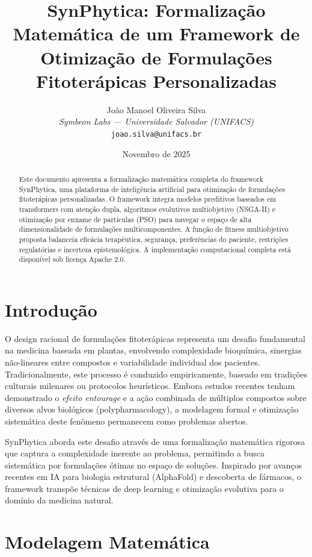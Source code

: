 \documentclass[12pt, a4paper]{article}
\title{\textbf{SynPhytica: Formalização Matemática de um Framework de Otimização de Formulações Fitoterápicas Personalizadas}}
\author{
    João Manoel Oliveira Silva \\
    \textit{Symbeon Labs — Universidade Salvador (UNIFACS)} \\
    \texttt{joao.silva@unifacs.br}
}
\date{Novembro de 2025}
\begin{document}
\maketitle

\begin{abstract}
Este documento apresenta a formalização matemática completa do framework SynPhytica, uma plataforma de inteligência artificial para otimização de formulações fitoterápicas personalizadas. O framework integra modelos preditivos baseados em transformers com atenção dupla, algoritmos evolutivos multiobjetivo (NSGA-II) e otimização por enxame de partículas (PSO) para navegar o espaço de alta dimensionalidade de formulações multicomponentes. A função de fitness multiobjetivo proposta balanceia eficácia terapêutica, segurança, preferências do paciente, restrições regulatórias e incerteza epistemológica. A implementação computacional completa está disponível sob licença Apache 2.0.
\end{abstract}

\section{Introdução}

O design racional de formulações fitoterápicas representa um desafio fundamental na medicina baseada em plantas, envolvendo complexidade bioquímica, sinergias não-lineares entre compostos e variabilidade individual dos pacientes. Tradicionalmente, este processo é conduzido empiricamente, baseado em tradições culturais milenares ou protocolos heurísticos. Embora estudos recentes tenham demonstrado o \textit{efeito entourage} e a ação combinada de múltiplos compostos sobre diversos alvos biológicos (polypharmacology), a modelagem formal e otimização sistemática deste fenômeno permanecem como problemas abertos.

SynPhytica aborda este desafio através de uma formalização matemática rigorosa que captura a complexidade inerente ao problema, permitindo a busca sistemática por formulações ótimas no espaço de soluções. Inspirado por avanços recentes em IA para biologia estrutural (AlphaFold) e descoberta de fármacos, o framework transpõe técnicas de deep learning e otimização evolutiva para o domínio da medicina natural.

\section{Modelagem Matemática}
\end{document}
